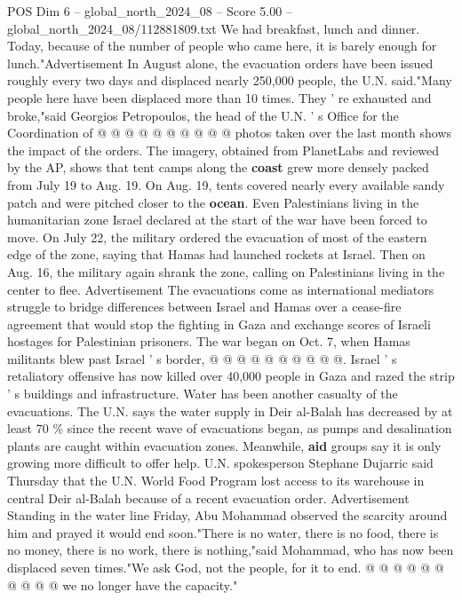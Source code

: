 \begin{textsample}{POS Dim 6 – global\_north\_2024\_08 – Score 5.00 – global\_north\_2024\_08/112881809.txt}
We had breakfast, lunch and dinner.
Today, because of the number of people who came here, it is barely enough for lunch."Advertisement In August alone, the evacuation orders have been issued roughly every two days and displaced nearly 250,000 people, the U.N. said."Many people here have been displaced more than 10 times.
They ' re exhausted and broke,"said Georgios Petropoulos, the head of the U.N. ' s Office for the Coordination of @ @ @ @ @ @ @ @ @ @ photos taken over the last month shows the impact of the orders.
The imagery, obtained from PlanetLabs and reviewed by the AP, shows that tent camps along the \textbf{coast} grew more densely packed from July 19 to Aug. 19.
On Aug. 19, tents covered nearly every available sandy patch and were pitched closer to the \textbf{ocean}.
Even Palestinians living in the humanitarian zone Israel declared at the start of the war have been forced to move.
On July 22, the military ordered the evacuation of most of the eastern edge of the zone, saying that Hamas had launched rockets at Israel.
Then on Aug. 16, the military again shrank the zone, calling on Palestinians living in the center to flee.
Advertisement The evacuations come as international mediators struggle to bridge differences between Israel and Hamas over a cease-fire agreement that would stop the fighting in Gaza and exchange scores of Israeli hostages for Palestinian prisoners.
The war began on Oct. 7, when Hamas militants blew past Israel ' s border, @ @ @ @ @ @ @ @ @ @.
Israel ' s retaliatory offensive has now killed over 40,000 people in Gaza and razed the strip ' s buildings and infrastructure.
Water has been another casualty of the evacuations.
The U.N. says the water supply in Deir al-Balah has decreased by at least 70 \% since the recent wave of evacuations began, as pumps and desalination plants are caught within evacuation zones.
Meanwhile, \textbf{aid} groups say it is only growing more difficult to offer help.
U.N. spokesperson Stephane Dujarric said Thursday that the U.N.
World Food Program lost access to its warehouse in central Deir al-Balah because of a recent evacuation order.
Advertisement Standing in the water line Friday, Abu Mohammad observed the scarcity around him and prayed it would end soon."There is no water, there is no food, there is no money, there is no work, there is nothing,"said Mohammad, who has now been displaced seven times."We ask God, not the people, for it to end. @ @ @ @ @ @ @ @ @ @ we no longer have the capacity."

\end{textsample}
